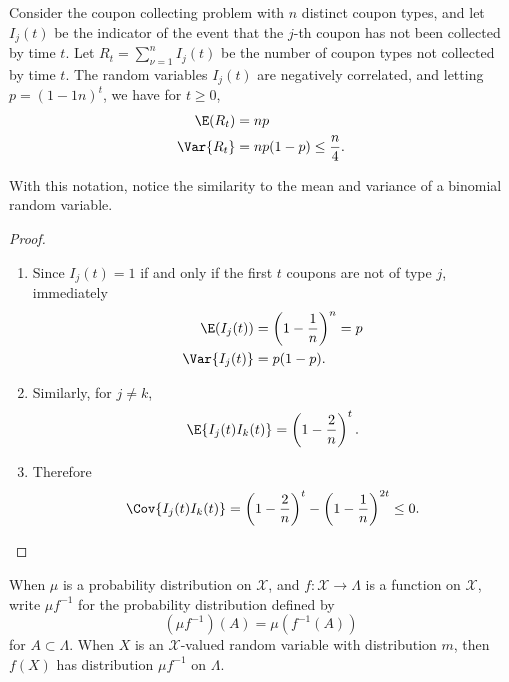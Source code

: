 \documentclass[12pt]{article}
\begin{document}
\begin{lemma}
    \label{thm:convergence:lem713}%
    Consider the coupon collecting problem with \( n \) distinct coupon
    types, and let \( I_j(t) \) be the indicator of the event that the \(
    j \)-th coupon has not been collected by time \( t \).  Let \( R_t =
    \sum_{\nu = 1}^n I_j(t) \) be the number of coupon types not
    collected by time \( t \). The random variables \( I_j(t) \) are
    negatively correlated, and letting \( p =(1 - 1 n)^t \), we have for
    \( t \ge 0 \),
    \begin{align*}
        \E(R_t) &= n p \\
        \Var{R_t} &= n p (1- p) \le \frac{n}{4}.
    \end{align*}
\end{lemma}

\begin{remark}
    With this notation, notice the similarity to the mean and variance
    of a binomial random variable.
\end{remark}

\begin{proof}
    \begin{enumerate}
        \item
            Since \( I_j(t) = 1 \) if and only if the first \( t \)
            coupons are not of type \( j \), immediately
            \begin{align*}
                \E(I_j(t) ) &= \left( 1 - \frac{1}{n} \right)^n = p \\
                \Var{I_j(t)} &= p (1- p).
            \end{align*}
        \item
            Similarly, for \( j \ne k \),
            \[
                \E{ I_j(t) I_k(t) } = \left( 1 - \frac{2}{n} \right)^t.
            \]
        \item
            Therefore
            \[
                \Cov{I_j(t) I_k(t)} = \left( 1 - \frac{2}{n} \right)^t -
                \left( 1 - \frac{1}{n} \right)^{2t} \le 0.
            \]
    \end{enumerate}
\end{proof}

\begin{definition}
    When \( \mu \) is a probability distribution on \( \mathcal{X} \),
    and \( f : \mathcal{X} \to \Lambda \) is a function on \( \mathcal{X}
    \), write \( \mu f^{-1} \) for the probability distribution defined
    by
    \[
        (\mu f^{-1})(A) = \mu(f^{-1}(A))
    \] for \( A \subset \Lambda \).  When \( X \) is an \( \mathcal{X} \)-valued
    random variable with distribution \( m \), then \( f(X) \) has
    distribution \( \mu f^{-1} \) on \( \Lambda \).
\end{definition}
\end{document}

